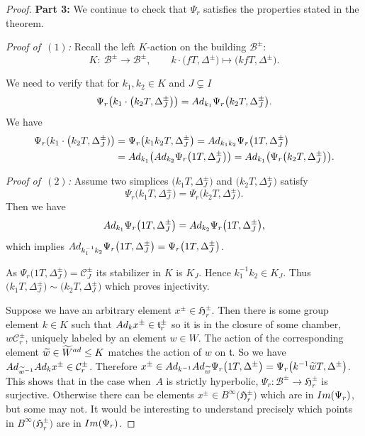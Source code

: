 \documentclass[11pt]{article}
\numberwithin{equation}{section}
\numberwithin{equation}{section}
\def\wtil{\widetilde w}
\def\Wtil{\widetilde W}
\def\cB{\mathcal B}
\def\cC{\mathcal C}
\def\fH{\mathfrak{H}}
\def\ft{\mathfrak{t}}
\begin{document}
\begin{proof}
{\bf Part 3:} We continue to check that $\Psi_r$ satisfies the properties stated in the theorem.

{\em Proof of~$(1)$:} Recall the left $K$-action on the building $\cB^\pm$:
\begin{displaymath}
K\colon \ \cB^\pm \longrightarrow \cB^\pm,\qquad k\cdot \big(fT, \Delta^\pm\big)\mapsto \big(kfT, \Delta^\pm\big).
\end{displaymath}

We need to verify that for $k_1,k_2\in K$ and $J\subsetneq I$
\[\Psi_r\big( k_1 \cdot\big(k_2T, \Delta^\pm_J\big)\big)={\rm Ad}_{k_1} \Psi_r\big(k_2 T, \Delta^\pm_J\big).\]
We have
\begin{align*}
\Psi_r (k_1\cdot \big(k_2 T, \Delta^\pm_J)\big)&=\Psi_r\big(k_1k_2T, \Delta^\pm_J\big)={\rm Ad}_{k_1k_2} \Psi_r\big(1 T, \Delta^\pm_J\big) \\
&={\rm Ad}_{k_1} \big({\rm Ad}_{k_2} \Psi_r\big(1 T,\Delta^\pm_J\big)\big)= {\rm Ad}_{k_1}\big(\Psi_r\big(k_2T, \Delta^\pm_J\big)\big).
\end{align*}

{\it Proof of~$(2)$:}
Assume two simplices $\big(k_1T, \Delta_J^\pm\big)$ and $\big(k_2T, \Delta_J^\pm\big)$ satisfy
\[\Psi_r\big(k_1T, \Delta_J^\pm\big)=\Psi_r\big(k_2T, \Delta_J^\pm\big).\]
Then we have
\[{\rm Ad}_{k_1} \Psi_r\big(1T, \Delta_J^\pm\big)={\rm Ad}_{k_2} \Psi_r\big(1T, \Delta_J^\pm\big),\]
which implies ${\rm Ad}_{k_1^{-1}k_2}\Psi_r\big(1T, \Delta_J^\pm\big)=\Psi_r\big(1T, \Delta_J^\pm\big)$.

As $\Psi_r\big(1T, \Delta_J^\pm\big)=\cC^\pm_J$ its stabilizer in $K$ is $K_J$. Hence $k_1^{-1}k_2\in K_J$.
Thus $\big(k_1T, \Delta_J^\pm\big)\sim\big(k_2T, \Delta_J^\pm\big)$ which proves injectivity.

Suppose we have an arbitrary element $x^\pm\in\fH_r^\pm$. Then there is some group element $k\in K$ such that
${\rm Ad}_k x^\pm\in \ft^\pm_r$ so it is in the closure of some chamber, $w\cC_r^\pm$, uniquely labeled by an element $w\in W$.
The action of the corresponding element $\wtil\in\Wtil^{\rm ad}\leq K$ matches the action of $w$ on $\ft$. So we have
${\rm Ad}_{\wtil^{-1}} {\rm Ad}_k x^\pm\in \cC^\pm_r$. Therefore
$x^\pm\in {\rm Ad}_{k^{-1}} {\rm Ad}_{\wtil} \Psi_r\big(1T, \Delta^\pm\big)=\Psi_r\big(k^{-1} \wtil T, \Delta^\pm\big)$.
This shows that in the case when~$A$ is strictly hyperbolic, $\Psi_r\colon \cB^\pm\to \fH_r^\pm$ is surjective. Otherwise there can be elements
$x^\pm\in B^\infty\big(\fH_r^\pm\big)$ which are in ${\rm Im}(\Psi_r)$, but some may not. It would be interesting to understand precisely which points in $B^\infty\big(\fH_r^\pm\big)$ are in ${\rm Im}(\Psi_r)$.


\end{proof}
\end{document}
